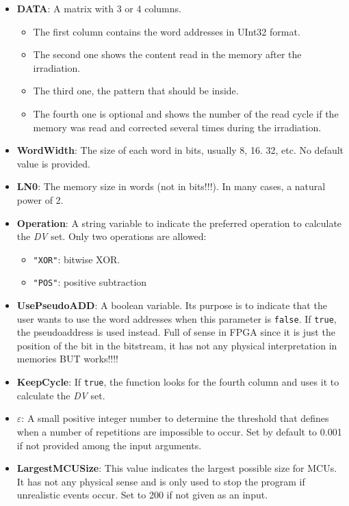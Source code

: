 \begin{itemize}
\begin{itemize}
 		\item   \textbf{DATA}: A matrix with 3 or 4 columns. 
 		\begin{itemize}
 			\item The first column contains the word addresses in UInt32 format.
 			\item The second one shows the content read in the memory after the irradiation.
 			\item The third one, the pattern that should be inside.
 			\item  The fourth one is optional and shows the number of the read cycle if the   memory was read and corrected several times during the irradiation.
 		\end{itemize}
 		\item   \textbf{WordWidth}: The size of each word in bits, usually 8, 16. 32, etc. No default value is provided.
 		\item   \textbf{LN0}: The memory size in words (not in bits!!!). In many cases, a natural power of 2.
 		\item   \textbf{Operation}: A string variable to indicate the preferred operation to calculate
 		the \textit{DV} set. Only two operations are allowed: 
 		\begin{itemize}
 			\item \texttt{"XOR"}: bitwise XOR.
 			\item\texttt{"POS"}: positive subtraction
 		\end{itemize}
 		\item  \textbf{UsePseudoADD}: A boolean variable. Its purpose is to indicate that the user wants to use the word addresses when this parameter is \texttt{false}. If \texttt{true}, the pseudoaddress  is used instead. Full of sense in FPGA since it is just the position  of the bit in the bitstream, it has not any physical interpretation in memories BUT works!!!!
 		\item   \textbf{KeepCycle}: If \texttt{true}, the function looks for the fourth column and uses it to calculate the \textit{DV} set.
 		\item   \textbf{\(\varepsilon\)}: A small positive integer number to determine the threshold that defines when a number of repetitions are impossible to occur. Set by default to 0.001 if not provided among the input arguments.
 		\item  \textbf{LargestMCUSize}: This value indicates the largest possible size for MCUs. It has not any physical sense  and is only used to stop the program if unrealistic events occur. Set to 200 if not given as an input.
 		

\end{itemize}
\end{itemize}
